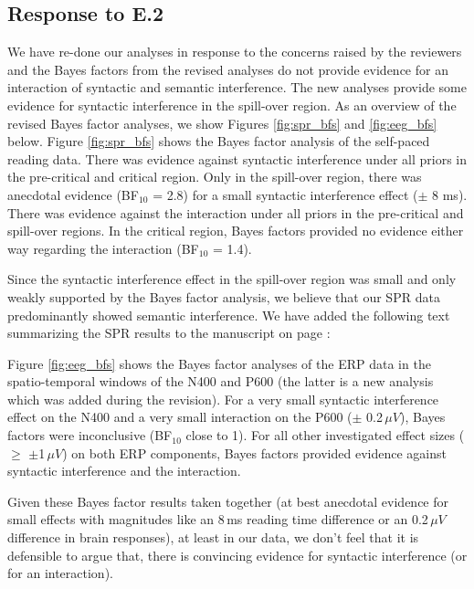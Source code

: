 \documentclass[12pt]{article}
\begin{document}
\subsection*{Response to E.2}
We have re-done our analyses in response to the concerns raised by the reviewers and the Bayes factors from the revised analyses do not provide evidence for an interaction of syntactic and semantic interference. The new analyses provide some evidence for syntactic interference in the spill-over region. As an overview of the revised Bayes factor analyses, we show Figures \ref{fig:spr_bfs} and \ref{fig:eeg_bfs} below. Figure \ref{fig:spr_bfs} shows the Bayes factor analysis of the self-paced reading data. There was evidence against syntactic interference under all priors in the pre-critical and critical region. Only in the spill-over region, there was anecdotal evidence (BF$_{10}$ = 2.8) for a small syntactic interference effect ($\pm$ 8 ms). There was evidence against the interaction under all priors in the pre-critical and spill-over regions. In the critical region, Bayes factors provided no evidence either way regarding the interaction (BF$_{10}$ = 1.4). 

\setcounter{figure}{4}

Since the syntactic interference effect in the spill-over region was small and only weakly supported by the Bayes factor analysis, we believe that our SPR data predominantly showed semantic interference. We have added the following text summarizing the SPR results to the manuscript on page \pageref{syn_interf}:

\begin{quote}
\end{quote}

Figure \ref{fig:eeg_bfs} shows the Bayes factor analyses of the ERP data in the spatio-temporal windows of the N400 and P600 (the latter is a new analysis which was added during the revision). For a very small syntactic interference effect on the N400 and a very small interaction on the P600 ($\pm$ 0.2\,$\mu V$), Bayes factors were inconclusive (BF$_{10}$ close to 1). For all other investigated effect sizes ($\geq$ $\pm$1\,$\mu V$) on both ERP components, Bayes factors provided evidence against syntactic interference and the interaction.  

Given these Bayes factor results taken together (at best anecdotal evidence for small effects with magnitudes like an 8\,ms reading time difference or an 0.2\,$\mu V$ difference in brain responses), at least in our data, we don't feel that it is defensible to argue that, there is convincing evidence for syntactic interference (or for an interaction). 
\end{document}
